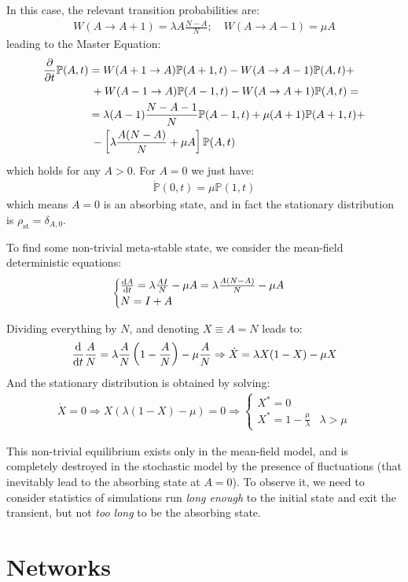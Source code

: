 \documentclass[../template.tex]{subfiles}
\begin{document}
In this case, the relevant transition probabilities are:
\begin{align*}
    W(A \to A+1) = \lambda A \frac{N-A}{N}; \quad W(A \to A-1) = \mu A 
\end{align*}
leading to the Master Equation:
\begin{align*}
    \pdv{t} \mathbb{P}(A,t) &= W(A+1 \to A) \mathbb{P}(A+1,t) - W(A \to A-1) \mathbb{P}(A,t) + \\
    &\> + W(A-1 \to A) \mathbb{P}(A-1, t) - W(A \to A+1) \mathbb{P}(A,t) =\\
    &= \lambda (A-1) \frac{N-A-1}{N} \mathbb{P}(A-1,t) + \mu(A+1)\mathbb{P}(A+1,t) +\\
    &\> - \left[\lambda \frac{A(N-A)}{N} + \mu A\right] \mathbb{P}(A,t) 
\end{align*}
which holds for any $A > 0$. For $A = 0$ we just have:
\begin{align*}
    \dot{\mathbb{P}}(0,t) = \mu \mathbb{P}(1,t)
\end{align*}
which means $A=0$ is an absorbing state, and in fact the stationary distribution is $\rho_{\mathrm{st}} = \delta_{A,0}$.

\medskip

To find some non-trivial meta-stable state, we consider the mean-field deterministic equations:
\begin{align*}
    \begin{cases}
        \dv{A}{t} = \lambda \frac{A I}{N} - \mu A = \lambda \frac{A(N-A)}{N} - \mu A\\
        N = I + A   
    \end{cases}
\end{align*}

Dividing everything by $N$, and denoting $X \equiv A=N$ leads to:
\begin{align*}
    \dv{t} \frac{A}{N} = \lambda \frac{A}{N} \left(1- \frac{A}{N} \right)   - \mu \frac{A}{N} \Rightarrow \dot{X} = \lambda X(1-X) - \mu X 
\end{align*}
And the stationary distribution is obtained by solving:
\begin{align*}
    \dot{X} = 0 \Rightarrow X(\lambda (1-X) - \mu) = 0 \Rightarrow \begin{cases}
        X^* = 0\\
        X^* = 1-\frac{\mu}{\lambda} & \lambda > \mu 
    \end{cases}
\end{align*}

This non-trivial equilibrium exists only in the mean-field model, and is completely destroyed in the stochastic model by the presence of fluctuations (that inevitably lead to the absorbing state at $A = 0$). To observe it, we need to consider statistics of simulations run \textit{long enough} to  the initial state and exit the transient, but not \textit{too long} to be  the absorbing state.

\section{Networks}
\end{document}
